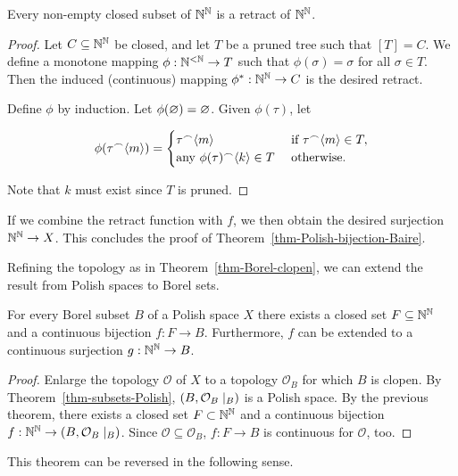\begin{lemma}\label{lem-closed-retract-baire}Every non-empty closed subset of $\mathbb{N}^{\mathbb{N}}$ is a retract of $\mathbb{N}^{\mathbb{N}}$.

\end{lemma}\begin{proof}Let $C \subseteq \mathbb{N}^{\mathbb{N}}$ be closed, and let $T$ be a pruned tree such that $[T] = C$. We define a monotone mapping $\phi:\mathbb{N}^{<\mathbb{N}} \to T$ such that $\phi(\sigma) = \sigma$ for all $\sigma \in T$. Then the induced (continuous) mapping $\phi^*: \mathbb{N}^{\mathbb{N}} \to C$ is the desired retract.

Define $\phi$ by induction. Let $\phi(\varnothing) = \varnothing$. Given $\phi(\tau)$, let

\begin{equation}
\phi(\tau\mbox{}^\frown\langle m \rangle) = \begin{cases}
        \tau\mbox{}^\frown\langle m \rangle & \text{ if } \tau\mbox{}^\frown\langle m \rangle \in T,\\
        \text{any } \phi(\tau)\mbox{}^\frown\langle k \rangle \in T & \text{ otherwise}.
    \end{cases}
\end{equation}

Note that $k$ must exist since $T$ is pruned.

\end{proof}If we combine the retract function with $f$, we then obtain the desired surjection $\mathbb{N}^{\mathbb{N}} \to X$. This concludes the proof of Theorem~\ref{thm-Polish-bijection-Baire}.

Refining the topology as in Theorem~\ref{thm-Borel-clopen}, we can extend the result from Polish spaces to Borel sets.

\begin{corollary}\label{cor-borel-image-closed}For every Borel subset $B$ of a Polish space $X$ there exists a closed set $F \subseteq \mathbb{N}^{\mathbb{N}}$ and a continuous bijection $f:F \to B$. Furthermore, $f$ can be extended to a continuous surjection $g:\mathbb{N}^{\mathbb{N}} \to B$.

\end{corollary}\begin{proof}Enlarge the topology $\mathcal{O}$ of $X$ to a topology $\mathcal{O}_B$ for which $B$ is clopen.
By Theorem~\ref{thm-subsets-Polish}, $(B,\mathcal{O}_B\mid_{B})$ is a Polish space. By the previous theorem, there exists a closed set $F \subset \mathbb{N}^{\mathbb{N}}$ and a continuous bijection $f:\mathbb{N}^{\mathbb{N}} \to (B,\mathcal{O}_B\mid_{B})$. Since $\mathcal{O} \subseteq \mathcal{O}_B$, $f:F \to B$ is continuous for $\mathcal{O}$, too.

\end{proof}This theorem can be reversed in the following sense.

